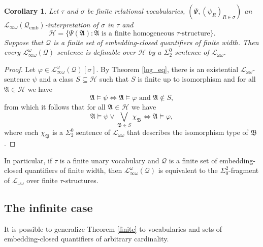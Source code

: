 \documentclass{ndjflart}
\theoremstyle{plain}
\newtheorem{corollary}[conjecture]{Corollary}
\theoremstyle{definition}
\numberwithin{equation}{section}
\DeclareMathOperator{\emb}{emb}
\begin{document}
\begin{corollary}
Let $\tau$ and $\sigma$ be finite relational vocabularies,
$(\Psi, (\psi_R)_{R \in \sigma})$ an
$\mathcal{L}_{\infty \omega}(\mathcal{Q}_{\emb})$-interpretation of $\sigma$ in
$\tau$ and
\[
\mathcal{H} = \{\Psi(\mathfrak{A})
\colon \mathfrak{A} \text{ is a finite homogeneous } \tau \text{-structure}\}.
\]
Suppose that $\mathcal{Q}$ is a finite set of embedding-closed quantifiers of
finite width.
Then every $\mathcal{L}^{\omega}_{\infty\omega}(\mathcal{Q})$-sentence is
definable over $\mathcal{H}$ by a $\Sigma^0_2$ sentence of
$\mathcal{L}_{\omega\omega}$.
\end{corollary}
\begin{proof}
Let $\varphi \in \mathcal{L}^{\omega}_{\infty\omega}(\mathcal{Q})[\sigma]$.
By Theorem \ref{log_eq}, there is an existential
$\mathcal{L}_{\omega\omega}$-sentence $\psi$ and a class
$S \subseteq \mathcal{H}$ such that $S$ is finite up to isomorphism and for all
$\mathfrak{A} \in \mathcal{H}$ we have
\[
	\mathfrak{A} \vDash \psi
	\Leftrightarrow \mathfrak{A} \vDash \varphi \text{ and } \mathfrak{A} \notin S,
\]
from which it follows that for all $\mathfrak{A} \in \mathcal{H}$ we have
\[
	\mathfrak{A} \vDash \psi \vee \bigvee_{\mathfrak{B} \in S} \chi_{\mathfrak{B}}
	\Leftrightarrow \mathfrak{A} \vDash \varphi,
\]
where each $\chi_{\mathfrak{B}}$ is a $\Sigma_2^0$ sentence of
$\mathcal{L}_{\omega \omega}$ that describes the isomorphism type of $\mathfrak{B}$.
\end{proof}

In particular, if $\tau$ is a finite unary vocabulary and $\mathcal{Q}$ is a
finite set of embedding-closed quantifiers of finite width, then
$\mathcal{L}_{\infty\omega}^{\omega}(\mathcal{Q})$ is equivalent to the
$\Sigma_0^2$-fragment of $\mathcal{L}_{\omega\omega}$ over finite $\tau$-structures.


\subsection{The infinite case}

It is possible to generalize Theorem \ref{finite} to vocabularies and sets of
embedding-closed quantifiers of arbitrary cardinality.
\end{document}
